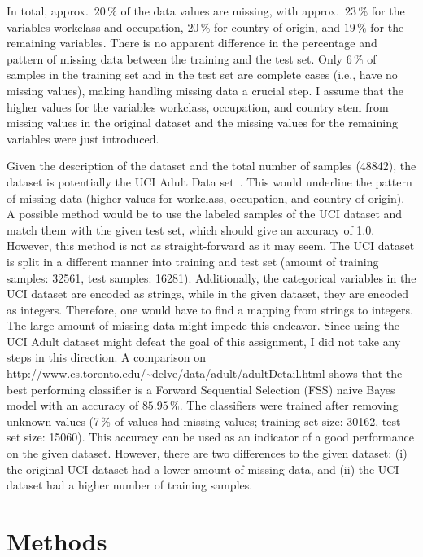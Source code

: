 \documentclass[a4paper]{article}
\begin{document}
In total, approx.\ $20\,\%$ of the data values are missing, with
approx.\ $23\,\%$ for the variables workclass and occupation, $20\,\%$
for country of origin, and $19\,\%$ for the remaining variables. There
is no apparent difference in the percentage and pattern of missing
data between the training and the test set. Only $6\,\%$ of samples in
the training set and in the test set are complete cases (i.e., have no
missing values), making handling missing data a crucial step. I assume
that the higher values for the variables workclass, occupation, and
country stem from missing values in the original dataset and the
missing values for the remaining variables were just introduced.

Given the description of the dataset and the total number of samples
(48842), the dataset is potentially the UCI Adult Data
set~\cite{lichman2013}. This would underline the pattern of missing
data (higher values for workclass, occupation, and country of
origin). A possible method would be to use the labeled samples of the
UCI dataset and match them with the given test set, which should give
an accuracy of 1.0. However, this method is not as straight-forward as
it may seem. The UCI dataset is split in a different manner into
training and test set (amount of training samples: 32561, test
samples: 16281). Additionally, the categorical variables in the UCI
dataset are encoded as strings, while in the given dataset, they are
encoded as integers. Therefore, one would have to find a mapping from
strings to integers. The large amount of missing data might impede
this endeavor. Since using the UCI Adult dataset might defeat the goal
of this assignment, I did not take any steps in this direction. A
comparison on
\url{http://www.cs.toronto.edu/~delve/data/adult/adultDetail.html}
shows that the best performing classifier is a Forward Sequential
Selection (FSS) naive Bayes model with an accuracy of $85.95\,\%$. The
classifiers were trained after removing unknown values (7\,\% of
values had missing values; training set size: 30162, test set size:
15060). This accuracy can be used as an indicator of a good
performance on the given dataset. However, there are two differences
to the given dataset: (i) the original UCI dataset had a lower amount
of missing data, and (ii) the UCI dataset had a higher number of
training samples.

\section{Methods}
\label{sec:methods}
\end{document}
